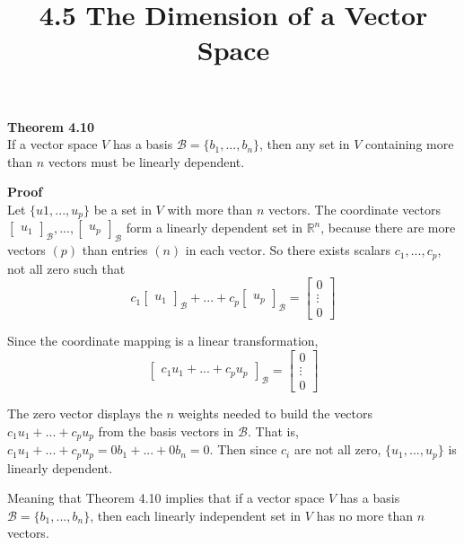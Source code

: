 \documentclass{article}
\title{4.5 The Dimension of a Vector Space}
\begin{document}
  \maketitle
  \textbf{Theorem 4.10}\\
  If a vector space $ V $ has a basis $ \mathcal{B}=\{ b_1,...,b_n \} $, then any set in $ V $ containing more than $ n $ vectors must be linearly dependent.

  \textbf{Proof}\\
  Let $ \{ u1,...,u_p \} $ be a set in $ V $ with more than $ n $ vectors. The coordinate vectors $ \begin{bmatrix}
    u_1
  \end{bmatrix}_\mathcal{B},...,\begin{bmatrix}
    u_p
  \end{bmatrix}_\mathcal{B} $ form a linearly dependent set in $ \mathbb{R}^{n} $, because there are more vectors $ (p) $ than entries $ (n) $ in each vector. So there exists scalars $ c_1,...,c_p $, not all zero such that
  \[
    c_1\begin{bmatrix}
      u_1
    \end{bmatrix}_\mathcal{B}+...+c_p\begin{bmatrix}
      u_p
    \end{bmatrix}_\mathcal{B}=\begin{bmatrix}
      0\\
      \vdots\\
      0
    \end{bmatrix}
  \]

  Since the coordinate mapping is a linear transformation,
  \[
    \begin{bmatrix}
      c_1u_1+...+c_pu_p
    \end{bmatrix}_\mathcal{B}=\begin{bmatrix}
      0\\
      \vdots\\
      0
    \end{bmatrix}
  \]

  The zero vector displays the $ n $ weights needed to build the vectors $ c_1u_1+...+c_pu_p $ from the basis vectors in $ \mathcal{B} $. That is, $ c_1u_1+...+c_pu_p=0b_1+...+0b_n=0 $. Then since $ c_i $ are not all zero, $ \{ u_1,...,u_p \} $ is linearly dependent.

  Meaning that Theorem 4.10 implies that if a vector space $ V $ has a basis $ \mathcal{B}=\{ b_1,...,b_n \} $, then each linearly independent set in $ V $ has no more than $ n $ vectors.
\end{document}
